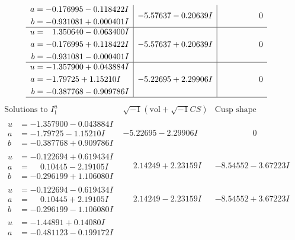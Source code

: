 \documentclass[1p]{elsarticle_modified}
\theoremstyle{definition}
\newcommand{\I}{\sqrt{-1}}
\begin{document}
$$\begin{array}{c|c|c}
\begin{aligned}
a &= -0.176995 - 0.118422 I \\
b &= -0.931081 + 0.000401 I\end{aligned}
 & -5.57637 - 0.20639 I & \phantom{-0.000000 } 0 \\ \hline\begin{aligned}
u &= \phantom{-}1.350640 - 0.063400 I \\
a &= -0.176995 + 0.118422 I \\
b &= -0.931081 - 0.000401 I\end{aligned}
 & -5.57637 + 0.20639 I & \phantom{-0.000000 } 0 \\ \hline\begin{aligned}
u &= -1.357900 + 0.043884 I \\
a &= -1.79725 + 1.15210 I \\
b &= -0.387768 - 0.909786 I\end{aligned}
 & -5.22695 + 2.29906 I & \phantom{-0.000000 } 0\\
 \hline 
 \end{array}$$\newpage$$\begin{array}{c|c|c}  
\text{Solutions to }I^u_{1}& \I (\text{vol} + \sqrt{-1}CS) & \text{Cusp shape}\\
 \hline 
\begin{aligned}
u &= -1.357900 - 0.043884 I \\
a &= -1.79725 - 1.15210 I \\
b &= -0.387768 + 0.909786 I\end{aligned}
 & -5.22695 - 2.29906 I & \phantom{-0.000000 } 0 \\ \hline\begin{aligned}
u &= -0.122694 + 0.619434 I \\
a &= \phantom{-}0.10445 - 2.19105 I \\
b &= -0.296199 + 1.106080 I\end{aligned}
 & \phantom{-}2.14249 + 2.23159 I & -8.54552 - 3.67223 I \\ \hline\begin{aligned}
u &= -0.122694 - 0.619434 I \\
a &= \phantom{-}0.10445 + 2.19105 I \\
b &= -0.296199 - 1.106080 I\end{aligned}
 & \phantom{-}2.14249 - 2.23159 I & -8.54552 + 3.67223 I \\ \hline\begin{aligned}
u &= -1.44891 + 0.14080 I \\
a &= -0.481123 - 0.199172 I \\

\end{aligned}
\end{array}$$
\end{document}

